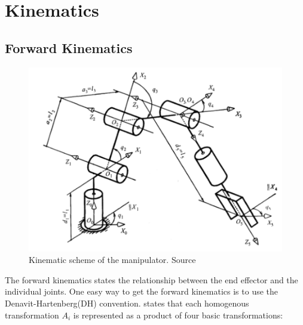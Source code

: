 \section*{Kinematics}
\subsection*{Forward Kinematics}
    
\begin{figure}[htbp]
  \centering
  \includegraphics[width=.9\textwidth]{img/DHconv.png}
  \caption{Kinematic scheme of the manipulator. Source \cite{Kinematics}}
  \label{fig:dhf}
\end{figure}

The forward kinematics states the relationship between the end effector and the individual joints. One easy way to get the forward kinematics is to use the Denavit-Hartenberg(DH) convention. \cite{spong} states that each homogenous transformation $A_i$ is represented as a product of four basic transformations: 


